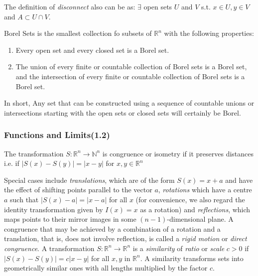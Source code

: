 The definition of \textit{disconnect} also can be as: $\exists$ open sets $U$ and $V$ s.t. $x\in U, y\in V$ and $A\subset U\cap V$.

\begin{definition}
    Borel Sets is the smallest collection fo subsets of $\mathbb{R}^n$ with the following properties:
    \begin{enumerate}
        \item Every open set and every closed set is a Borel set.
        \item The union of every finite or countable collection of Borel sets is a Borel set, and the intersection of every finite or countable collection of Borel sets is a Borel set.
    \end{enumerate}
\end{definition}

In short, Any set that can be constructed using a sequence of countable unions or intersections starting with the open sets or closed sets will certainly be Borel.

\subsubsection{Functions and Limits(1.2)}

\begin{definition}[Congruence]
    The transformation $S : \mathbb{R}^n\rightarrow \mathbb{N}^n$ is congruence or isometry if it preserves distances i.e. if $|S(x)-S(y)| = |x-y|$ for $x, y\in \mathbb{R}^n$
    
\end{definition}

Special cases include \textit{translations}, which are of the form 
$S(x)=x+a$ and have the effect of shifting points parallel 
to the vector $a$, \textit{rotations} which have a centre $a$ such 
that $|S(x)-a|=|x-a|$ for all $x$ (for convenience, we also 
regard the identity transformation given by $I(x)=x$ as a 
rotation) and \textit{reflections}, which maps points to their mirror 
images in some $(n-1)$-dimensional plane. A congruence that 
may be achieved by a combination of a rotation and a translation, 
that is, does not involve reflection, is called a \textit{rigid motion} or 
\textit{direct congruence}. A transformation 
$S: \mathbb{R}^{n} \rightarrow \mathbb{R}^{n}$ is a \textit{similarity} of 
\textit{ratio} or \textit{scale} $c>0$ if $|S(x)-S(y)|=c|x-y|$ for all $x, y$ 
in $\mathbb{R}^{n} .$ A similarity transforms sets into geometrically 
similar ones with all lengths multiplied by the factor $c$.


